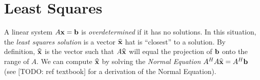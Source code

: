 \section*{Least Squares}

A linear system $A{\bf x}={\bf b}$ is \emph{overdetermined} if it has no solutions. 
In this situation, the \emph{least squares solution} is a vector $\widehat{{\bf x}}$ hat is ``closest'' to a solution. 
By definition, $\widehat{{\bf x}}$ is the vector such that $A\widehat{{\bf x}}$ will equal the projection of ${\bf b}$ onto the range of $A$. 
We can compute $\widehat{{\bf x}}$ by solving the \emph{Normal Equation} $A^HA\widehat{{\bf x}} = A^H{\bf b}$ (see [TODO: ref textbook] for a derivation of the Normal Equation).


